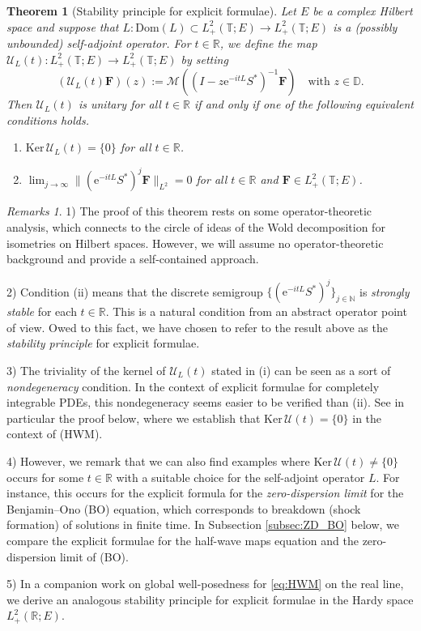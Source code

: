 \documentclass[10pt,reqno,a4paper]{amsart}
\newtheorem*{thmn}{Theorem}
\theoremstyle{definition}
\theoremstyle{remark}
\theoremstyle{remark}
\newtheorem*{remarks*}{Remarks}
\numberwithin{equation}{section}
\newcommand{\N}{\mathbb{N}}
\newcommand{\R}{\mathbb{R}}
\newcommand{\T}{\mathbb{T}}
\newcommand{\D}{\mathbb{D}}
\newcommand{\Mean}{\mathscr{M}}
\renewcommand{\ker}{\mathrm{Ker}}
\newcommand{\dom}{\mathrm{Dom}}
\newcommand{\eu}{\mathrm{e}}
\newcommand{\Fb}{\mathbf{F}}
\newcommand{\id}{I}
\newcommand{\Us}{\mathscr{U}}
\begin{document}
\begin{thmn}[Stability principle for explicit formulae]
Let $E$ be a complex Hilbert space and suppose that $L : \dom(L) \subset L^2_+(\T; E) \to L^2_+(\T; E)$ is a (possibly unbounded) self-adjoint operator. For $t \in \R$, we define the map $\Us_L(t) : L^2_+(\T; E) \to L^2_+(\T;E)$ by setting
$$
(\Us_L(t) \Fb)(z) := \Mean \left ( ( \id- z \eu^{-it L} S^*)^{-1} \Fb \right ) \quad \mbox{with $z \in \D$}.
$$
Then $\Us_L(t)$ is unitary for all $t \in \R$ if and only if one of the following equivalent conditions holds.
\begin{enumerate}
\item[(i)] $\ker \, \Us_L(t) = \{ 0 \}$ for all $t\in \R$.
\item[(ii)] $\displaystyle \lim_{j \to \infty} \| (\eu^{-it L} S^*)^j \Fb \|_{L^2} = 0$ for all $t \in \R$ and $\Fb \in L^2_+(\T; E)$. 
\end{enumerate}
\end{thmn} 

\begin{remarks*}
1) The proof of this theorem rests on some operator-theoretic analysis, which connects to the circle of ideas of the Wold decomposition for isometries on Hilbert spaces. However, we will assume no operator-theoretic background and provide a self-contained approach.

2) Condition (ii) means that the discrete semigroup $\{ (\eu^{-it L} S^*)^j \}_{j \in \N}$ is {\em strongly stable} for each $t \in \R$. This is a natural condition from an abstract operator point of view. Owed to this fact, we have chosen to refer to the result above as the {\em stability principle} for explicit formulae.

3) The triviality of the kernel of $\Us_L(t)$ stated in (i) can be seen as a sort of {\em nondegeneracy} condition. In the context of explicit formulae for completely integrable PDEs, this nondegeneracy seems easier to be verified than (ii). See in particular the proof below, where we establish that $\ker \, \Us(t) = \{ 0 \}$ in the context of (HWM).

4) However, we remark that we can also find examples where $\ker \, \Us(t) \neq \{ 0 \}$ occurs for some $t \in \R$ with a suitable choice for the self-adjoint operator $L$. For instance, this occurs for the explicit formula for the {\em zero-dispersion limit} for the Benjamin--Ono (BO) equation, which corresponds to breakdown (shock formation) of solutions in finite time. In Subsection \ref{subsec:ZD_BO} below, we compare  the explicit formulae for the half-wave maps equation and the zero-dispersion limit of (BO).

5) In a companion work on global well-posedness for \eqref{eq:HWM} on the real line, we derive an analogous stability principle for explicit formulae in the Hardy space $L^2_+(\R;E)$.
\end{remarks*}
\end{document}
